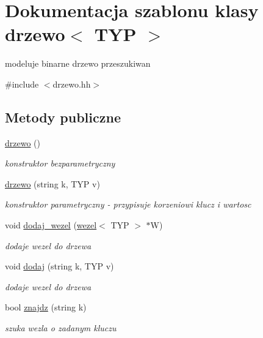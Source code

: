 \hypertarget{classdrzewo}{\section{\-Dokumentacja szablonu klasy drzewo$<$ \-T\-Y\-P $>$}
\label{classdrzewo}
}


modeluje binarne drzewo przeszukiwan  




{\ttfamily \#include $<$drzewo.\-hh$>$}

\subsection*{\-Metody publiczne}
\begin{DoxyCompactItemize}
\item 
\hyperlink{classdrzewo_ad43b2e4e82dc089736b57064865fa449}{drzewo} ()
\begin{DoxyCompactList}\small\item\em konstruktor bezparametryczny \end{DoxyCompactList}\item 
\hyperlink{classdrzewo_abaa93ec27e55b1a58c747f680446ffd4}{drzewo} (string k, \-T\-Y\-P v)
\begin{DoxyCompactList}\small\item\em konstruktor parametryczny -\/ przypisuje korzeniowi klucz i wartosc \end{DoxyCompactList}\item 
void \hyperlink{classdrzewo_a9c52aa0c3842425ff5900429bbf0c43d}{dodaj\-\_\-wezel} (\hyperlink{classwezel}{wezel}$<$ \-T\-Y\-P $>$ $\ast$\-W)
\begin{DoxyCompactList}\small\item\em dodaje wezel do drzewa \end{DoxyCompactList}\item 
void \hyperlink{classdrzewo_a53ccf9b49a62bcb6b5dfab4e48415cc1}{dodaj} (string k, \-T\-Y\-P v)
\begin{DoxyCompactList}\small\item\em dodaje wezel do drzewa \end{DoxyCompactList}\item 
bool \hyperlink{classdrzewo_ad9d512467919623595126d88bdb60974}{znajdz} (string k)
\begin{DoxyCompactList}\small\item\em szuka wezla o zadanym kluczu \end{DoxyCompactList}\item 

\end{DoxyCompactItemize}

